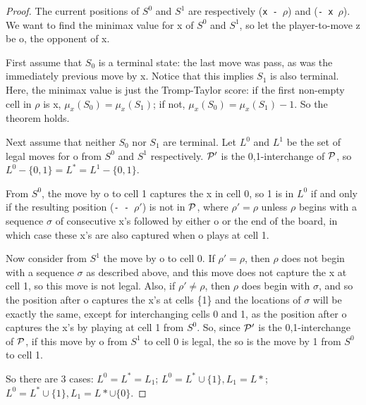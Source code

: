 \begin{proof}
The current positions of $S^0$ and $S^1$ are respectively
({\tt x - }$\rho$) and ({\tt - x }$\rho$).
We want to find the minimax value for x of $S^0$ and $S^1$,
so let the player-to-move z be o, the opponent of x. 

First assume that $S_0$ is a terminal state:
the last move was pass, as was the immediately previous move by x.
Notice that this implies $S_1$ is also terminal.
Here, the minimax value is just the Tromp-Taylor score:
if the first non-empty cell in $\rho$ is x, $\mu_x(S_0)=\mu_x(S_1)$;
if not, $\mu_x(S_0) = \mu_x(S_1) - 1$.
So the theorem holds.

Next assume that neither $S_0$ nor $S_1$ are terminal.
Let $L^0$ and $L^1$
be the set of legal moves for o from $S^0$ and $S^1$ respectively.
${\mathcal{P}}'$ is the 0,1-interchange of ${\mathcal{P}}$,
so $L^0 - \{0,1\} = L^* = L^1 - \{0,1\}$.

From $S^0$,
the move by o to cell 1 captures the x in cell 0,
so 1 is in $L^0$ if and only if the resulting position
({\tt - - }$\rho'$) is not in ${\mathcal{P}}$,
where $\rho' = \rho$ unless $\rho$ begins with a sequence
$\sigma$ of consecutive x's followed by either o or the end of the board,
in which case these x's are also captured when o plays at cell 1.

Now consider from $S^1$ the move by o to cell 0.
If $\rho' = \rho$, then $\rho$ does not begin with a sequence $\sigma$
as described above, and this move does not capture the x
at cell 1, so this move is not legal.
Also, if $\rho' \neq \rho$, then
$\rho$ does begin with $\sigma$,
and so the position after o captures the x's at cells \{1\} 
and the locations of $\sigma$ will be exactly the same,
except for interchanging cells 0 and 1,
as the position after o captures the x's by playing at cell 1 from $S^0$.
So, since ${\mathcal{P}}'$ is the 0,1-interchange of ${\mathcal{P}}$,
if this move by o from $S^1$ to cell 0 is legal,
the so is the move by 1 from $S^0$ to cell 1.

So there are 3 cases:
$L^0 = L^* = L_1$;
$L^0 = L^* \cup \{1\}, L_1 = L*$;
$L^0 = L^* \cup \{1\}, L_1 = L* \cup \{0\}$.


\end{proof}
